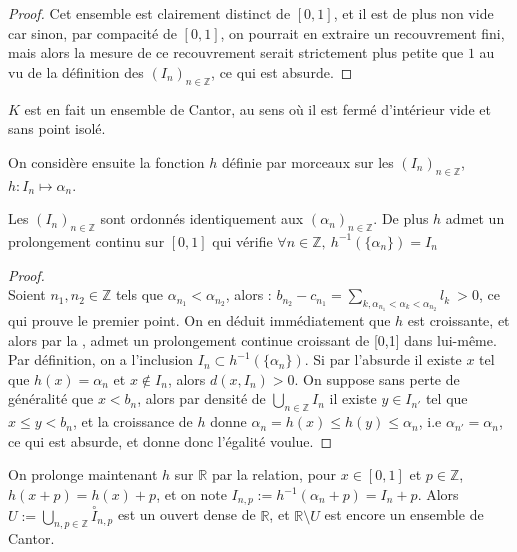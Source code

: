 \documentclass[11pt,a4paper]{article}
\begin{document}
\begin{proof}
Cet ensemble est clairement distinct de $[0,1]$, et il est de plus non vide car sinon, par compacité de $[0,1]$, on pourrait en extraire un recouvrement fini, mais alors la mesure de ce recouvrement serait strictement plus petite que $1$ au vu de la définition des $(I_n)_{n\in\mathbb{Z}}$, ce qui est absurde. 
\end{proof}


\begin{rmq}
$K$ est en fait un ensemble de Cantor, au sens où il est fermé d'intérieur vide et sans point isolé.
\end{rmq}

On considère ensuite la fonction $h$ définie par morceaux sur les $(I_n)_{n\in\mathbb{Z}}$, $h : I_n \mapsto \alpha_n$. 

\begin{lemma} 
Les $(I_n)_{n\in\mathbb{Z}}$ sont ordonnés identiquement aux $(\alpha_n)_{n\in\mathbb{Z}}$. De plus $h$ admet un prolongement continu sur $[0,1]$ qui vérifie $\forall n \in \mathbb{Z},\  h^{-1}(\{\alpha_n\})=I_n$
\end{lemma}


\begin{proof} \\
Soient $n_1,n_2 \in \mathbb{Z}$ tels que $\alpha_{n_1} < \alpha_{n_2}$, alors : $b_{n_2} - c_{n_1} = \displaystyle \sum_{k, \alpha_{n_1} < \alpha_k < \alpha_{n_2}} l_k \  > 0$, ce qui prouve le premier point. On en déduit immédiatement que $h$ est croissante, et alors par la , admet un prolongement continue croissant de [0,1] dans lui-même. \\
 Par définition, on a l'inclusion $I_n \subset h^{-1}(\{\alpha_n\})$. Si par l'absurde il existe $x$ tel que $h(x)=\alpha_n$ et $x \notin I_n$, alors $d(x,I_n) >0$. On suppose sans perte de généralité que $x<b_n$, alors par densité de $\displaystyle \bigcup_{n\in \mathbb{Z}} I_n$ il existe $y\in I_{n'}$ tel que $x\leq y < b_n$, et la croissance de $h$ donne $\alpha_n = h(x) \leq h(y) \leq \alpha_n$, i.e $\alpha_{n'} = \alpha_n$, ce qui est absurde, et donne donc l'égalité voulue. 
\end{proof}

On prolonge maintenant $h$ sur $\mathbb{R}$ par la relation, pour $x\in [0,1]$ et $p\in \mathbb{Z}$, $h(x+p)=h(x)+p$, et on note $I_{n,p}:=h^{-1}(\alpha_n+p)=I_n + p$. Alors $\displaystyle U:= \bigcup_{n,p \in \mathbb{Z}} \overset{\circ}I_{n,p}$ est un ouvert dense de $\mathbb{R}$, et $\mathbb{R}\setminus U$ est encore un ensemble de Cantor. \\
\end{document}
